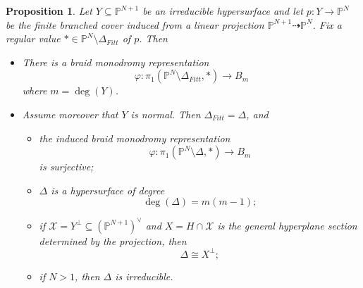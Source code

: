 \documentclass[12pt]{amsart}
\newtheorem{proposition}[theorem]{Proposition}
\begin{document}
\begin{proposition}\label{prop:surjection-permutation-irreducible}
     Let $Y\subseteq\mathbb{P}^{N+1}$ be an irreducible hypersurface and let $p:Y\to \mathbb P^N$ be the finite branched cover induced from a linear projection $\mathbb{P}^{N+1}\dashrightarrow\mathbb{P}^N$. Fix a regular value $\ast\in\mathbb{P}^N\setminus \Delta_{Fitt}$ of $p$. Then 
     
     \begin{itemize}
         \item[(1)]  There is a braid monodromy representation \[
    \varphi: \pi_1\left(\mathbb{P}^N\setminus\Delta_{Fitt},\ast\right)\to B_m
     \] 
     where $m=\deg (Y)$.

     \item[(2)] Assume moreover that $Y$ is normal. Then $\Delta_{Fitt}=\Delta$, and
    \begin{itemize}
     
        \item[(a)] the induced braid monodromy representation
        \[
            \varphi:\pi_1(\mathbb P^N\setminus \Delta,\ast)\to B_m
        \]
        is surjective;

        \item[(b)] $\Delta$ is a hypersurface of degree
        \[
            \deg(\Delta)=m(m-1);
        \]

        \item[(c)] if $\mathcal X=Y^\perp\subseteq (\mathbb P^{N+1})^\vee$ and
        $X=H\cap \mathcal X$ is the general hyperplane section determined by the projection,
        then
        \[
            \Delta \cong X^\perp;
        \]

        \item[(d)] if $N>1$, then $\Delta$ is irreducible.
  
    \end{itemize}
     \end{itemize}
  
 \end{proposition}
\end{document}
